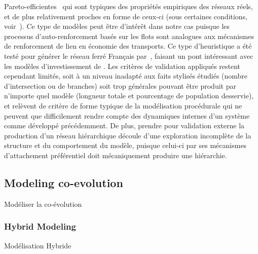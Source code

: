 {Pareto-efficientes~\cite{tero2010rules} qui sont typiques des propriétés empiriques des réseaux réels, et de plus relativement proches en forme de ceux-ci (sous certaines conditions, voir~\cite{adamatzky2010road}). Ce type de modèles peut être d'intérêt dans notre cas puisque les processus d'auto-renforcement basés sur les flots sont analogues aux mécanismes de renforcement de lien en économie des transports. Ce type d'heuristique a été testé pour générer le réseau ferré Français par~\cite{mimeur:tel-01451164}, faisant un pont intéressant avec les modèles d'investissement de . Les critères de validation appliqués restent cependant limités, soit à un niveau inadapté aux faits stylisés étudiés (nombre d'intersection ou de branches) soit trop générales pouvant être produit par n'importe quel modèle (longueur totale et pourcentage de population desservie), et relèvent de critère de forme typique de la modélisation procédurale qui ne peuvent que difficilement rendre compte des dynamiques internes d'un système comme développé précédemment. De plus, prendre pour validation externe la production d'un réseau hiérarchique découle d'une exploration incomplète de la structure et du comportement du modèle, puisque celui-ci par ses mécanismes d'attachement préférentiel doit mécaniquement produire une hiérarchie.
}







\subsection{Modeling co-evolution}{Modéliser la co-évolution}


\subsubsection{Hybrid Modeling}{Modélisation Hybride}




